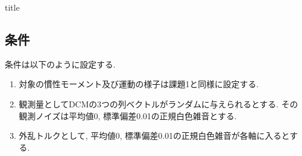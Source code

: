 \documentclass[dvipdfmx, fleqn, uplatex, a4paper]{jsarticle}
\begin{document}
{title}

\subsection{条件}
条件は以下のように設定する.
\begin{enumerate}
  \item 対象の慣性モーメント及び運動の様子は課題1と同様に設定する.
  \item 観測量としてDCMの3つの列ベクトルがランダムに与えられるとする. その観測ノイズは平均値0,
  標準偏差0.01の正規白色雑音とする.
  \item 外乱トルクとして, 平均値0, 標準偏差0.01の正規白色雑音が各軸に入るとする.
\end{enumerate}
\end{document}
